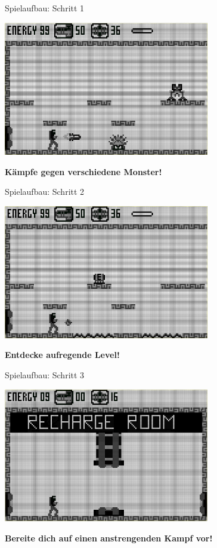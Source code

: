\documentclass[fleqn]{beamer}
\begin{document}
    \begin{frame}{Spielaufbau: Schritt 1}
        \begin{center}
            \includegraphics[width=9cm]{Bilder/world2.png}
            
            \large \textbf{Kämpfe gegen verschiedene Monster!}
        \end{center}
     \end{frame}  
    \begin{frame}{Spielaufbau: Schritt 2}
        \begin{center}
            \includegraphics[width=9cm]{Bilder/world3.png}
            
            \large \textbf{Entdecke aufregende Level!}
        \end{center}
    \end{frame}
    \begin{frame}{Spielaufbau: Schritt 3}
        \begin{center}
            \includegraphics[width=9cm]{Bilder/world4.png}
            
            \large \textbf{Bereite dich auf einen anstrengenden Kampf vor!}
        \end{center}
    \end{frame}
\end{document}
